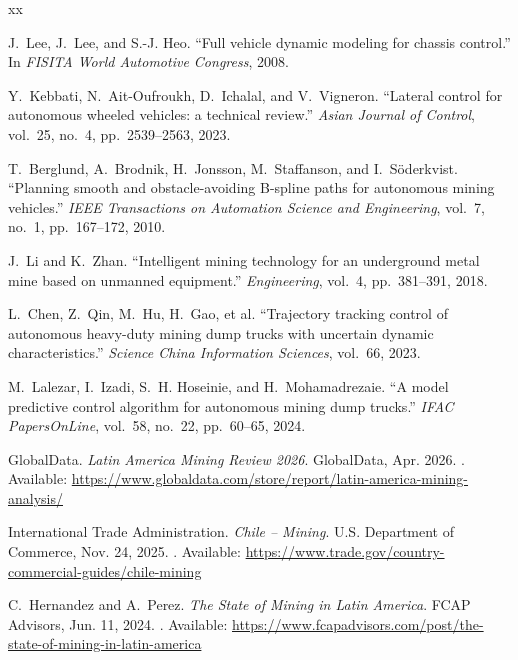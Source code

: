 \documentclass{ifacconf}
\begin{document}
\begin{thebibliography}{xx}

J.~Lee, J.~Lee, and S.-J. Heo.
\newblock ``Full vehicle dynamic modeling for chassis control.''
\newblock In \emph{FISITA World Automotive Congress}, 2008.

Y.~Kebbati, N.~Ait-Oufroukh, D.~Ichalal, and V.~Vigneron.
\newblock ``Lateral control for autonomous wheeled vehicles: a technical review.''
\newblock \emph{Asian Journal of Control}, vol.~25, no.~4, pp.~2539--2563, 2023.

T.~Berglund, A.~Brodnik, H.~Jonsson, M.~Staffanson, and I.~S\"oderkvist.
\newblock ``Planning smooth and obstacle-avoiding B-spline paths for autonomous mining vehicles.''
\newblock \emph{IEEE Transactions on Automation Science and Engineering}, vol.~7, no.~1, pp.~167--172, 2010.

J.~Li and K.~Zhan.
\newblock ``Intelligent mining technology for an underground metal mine based on unmanned equipment.''
\newblock \emph{Engineering}, vol.~4, pp.~381--391, 2018.

L.~Chen, Z.~Qin, M.~Hu, H.~Gao, et al.
\newblock ``Trajectory tracking control of autonomous heavy-duty mining dump trucks with uncertain dynamic characteristics.''
\newblock \emph{Science China Information Sciences}, vol.~66, 2023.

M.~Lalezar, I.~Izadi, S.~H. Hoseinie, and H.~Mohamadrezaie.
\newblock ``A model predictive control algorithm for autonomous mining dump trucks.''
\newblock \emph{IFAC PapersOnLine}, vol.~58, no.~22, pp.~60--65, 2024.

GlobalData.
\newblock \emph{Latin America Mining Review 2026}.
\newblock GlobalData, Apr. 2026.
\newblock [Online]. Available: \url{https://www.globaldata.com/store/report/latin-america-mining-analysis/}

International Trade Administration.
\newblock \emph{Chile -- Mining}.
\newblock U.S. Department of Commerce, Nov. 24, 2025.
\newblock [Online]. Available: \url{https://www.trade.gov/country-commercial-guides/chile-mining}

C.~Hernandez and A.~Perez.
\newblock \emph{The State of Mining in Latin America}.
\newblock FCAP Advisors, Jun. 11, 2024.
\newblock [Online]. Available: \url{https://www.fcapadvisors.com/post/the-state-of-mining-in-latin-america}


\end{thebibliography}
\end{document}
